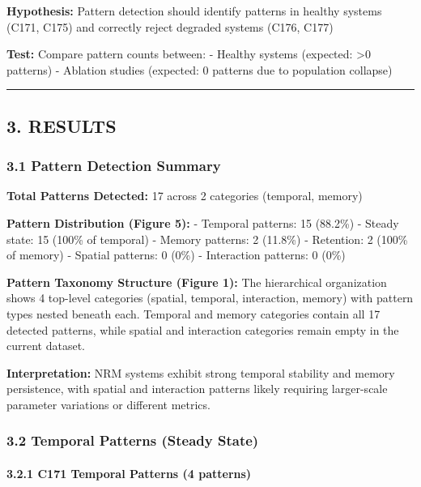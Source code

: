 \documentclass[
]{article}
\begin{document}
\textbf{Hypothesis:} Pattern detection should identify patterns in
healthy systems (C171, C175) and correctly reject degraded systems
(C176, C177)

\textbf{Test:} Compare pattern counts between: - Healthy systems
(expected: \textgreater0 patterns) - Ablation studies (expected: 0
patterns due to population collapse)

\begin{center}\rule{0.5\linewidth}{0.5pt}\end{center}

\subsection{3. RESULTS}\label{results}

\subsubsection{3.1 Pattern Detection
Summary}\label{pattern-detection-summary}

\textbf{Total Patterns Detected:} 17 across 2 categories (temporal,
memory)

\textbf{Pattern Distribution (Figure 5):} - Temporal patterns: 15
(88.2\%) - Steady state: 15 (100\% of temporal) - Memory patterns: 2
(11.8\%) - Retention: 2 (100\% of memory) - Spatial patterns: 0 (0\%) -
Interaction patterns: 0 (0\%)

\textbf{Pattern Taxonomy Structure (Figure 1):} The hierarchical
organization shows 4 top-level categories (spatial, temporal,
interaction, memory) with pattern types nested beneath each. Temporal
and memory categories contain all 17 detected patterns, while spatial
and interaction categories remain empty in the current dataset.

\textbf{Interpretation:} NRM systems exhibit strong temporal stability
and memory persistence, with spatial and interaction patterns likely
requiring larger-scale parameter variations or different metrics.

\subsubsection{3.2 Temporal Patterns (Steady
State)}\label{temporal-patterns-steady-state}

\paragraph{3.2.1 C171 Temporal Patterns (4
patterns)}\label{c171-temporal-patterns-4-patterns}
\end{document}
